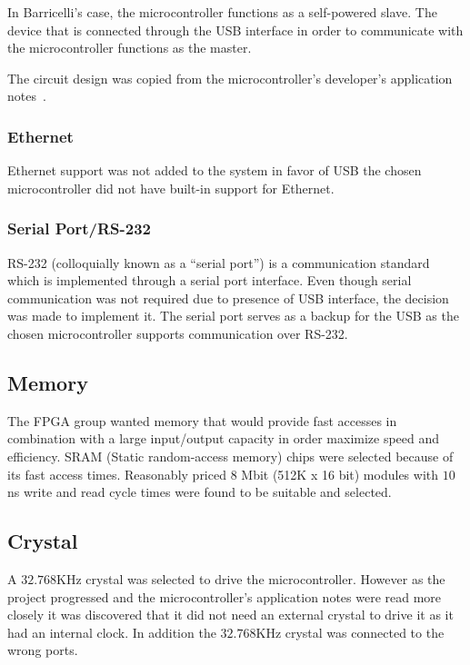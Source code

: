 In Barricelli's case, the microcontroller functions as a self-powered slave.
The device that is connected through the USB interface in order to communicate with the microcontroller functions as the master.

The circuit design was copied from the microcontroller's developer's application notes~\cite[Figure 2.2]{an0046}.

\subsubsection{Ethernet}
Ethernet support was not added to the system in favor of USB the chosen microcontroller did not have built-in support for Ethernet.


\subsubsection{Serial Port/RS-232} 
RS-232 (colloquially known as a ``serial port'') is a communication standard which is implemented through a serial port interface.
Even though serial communication was not required due to presence of USB interface, the decision was made to implement it.
The serial port serves as a backup for the USB as the chosen microcontroller supports communication over RS-232.

\subsection{Memory} \label{pcb:design-choices:ss:memory}
The FPGA group wanted memory that would provide fast accesses in combination with a large input/output capacity in order maximize speed and efficiency.
SRAM (Static random-access memory) chips were selected because of its fast access times.
Reasonably priced 8 Mbit (512K x 16 bit) modules with $10$ns write and read cycle times were found to be suitable and selected. 

\subsection{Crystal}
A $32.768$KHz crystal was selected to drive the microcontroller.
However as the project progressed and the microcontroller's application notes were read more closely it was discovered that it did not need an external crystal to drive it as it had an internal clock.
In addition the $32.768$KHz crystal was connected to the wrong ports. 
